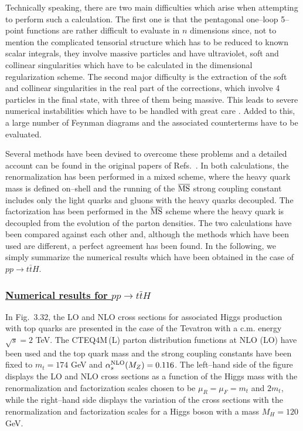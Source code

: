 Technically speaking, there are two main difficulties which arise when
attempting to perform such a calculation. The first one is that the pentagonal
one--loop 5--point functions \cite{5point-function} are rather difficult to
evaluate in $n$ dimensions since, not to mention the complicated tensorial
structure which has to be reduced to known scalar integrals, they involve
massive particles and have ultraviolet, soft and collinear singularities which
have to be calculated in the dimensional regularization scheme. The second
major difficulty is the extraction of the soft and collinear singularities in
the real part of the corrections, which involve 4 particles in the final state,
with three of them being massive. This leads to severe numerical instabilities
which have to be handled with great care \cite{Diople-Formalism}. Added to
this, a large number of Feynman diagrams and the associated counterterms have
to be evaluated. \s

Several methods have been devised to overcome these problems and a detailed
account can be found in the original papers of
Refs.~\cite{Htt-NLO-DESY,Htt-NLO-US}.  In both calculations, the
renormalization has been performed in a mixed  scheme, where the heavy quark
mass is defined on--shell and the running of the $\overline{\rm MS}$ strong
coupling constant includes only the light quarks and gluons with the heavy
quarks decoupled. The factorization has been performed in the $\overline{\rm
MS}$ scheme where the heavy quark is decoupled from the evolution of the parton
densities.  The two calculations have been compared against each other and,
although the methods which have been used are different, a perfect agreement
has been found.  In the following, we simply summarize the numerical results
which have been obtained in the case of $pp \to t\bar t H$.

\subsubsection*{\underline{Numerical results for $pp \to t\bar t H$}}

In Fig.~3.32, the LO and NLO cross sections for associated Higgs production
with top quarks are presented in the case of the Tevatron with a c.m. 
energy $\sqrt{s}=2$ TeV. The CTEQ4M\,(L) parton distribution functions at 
NLO (LO) have been used and the top quark mass and the strong
coupling constants have been fixed to $m_t=174$ GeV and $\alpha_s^{\rm
NLO}(M_Z) =0.116$. The left--hand side of the figure displays the LO and NLO
cross sections as a function of the Higgs mass with the renormalization and
factorization scales chosen to be $\mu_R=\mu_F=m_t$ and $2m_t$, while the 
right--hand side displays the variation of the cross sections with the 
renormalization and factorization scales for a Higgs boson with a mass 
$M_H=120$ GeV.\s 

